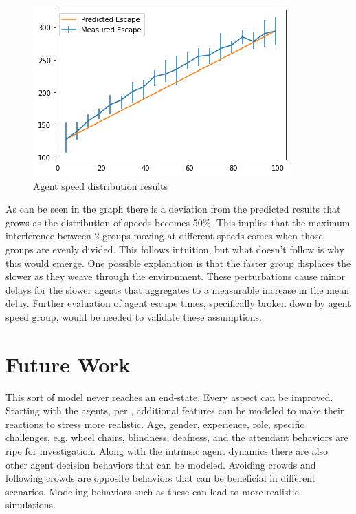 \documentclass[12pt,letterpaper]{article}
\begin{document}
\begin{figure} [!ht]
  \centering
  \includegraphics[width=.75\linewidth]{./figures/speed_dist_test.png}
  \caption{Agent speed distribution results}
  \label{fig:speedResults}
\end{figure}

As can be seen in the graph there is a deviation from the predicted results that grows as the distribution of speeds becomes 50\%.  This implies that the maximum interference between 2 groups moving at different speeds comes when those groups are evenly divided.  This follows intuition, but what doesn't follow is why this would emerge.  One possible explanation is that the faster group displaces the slower as they weave through the environment.  These perturbations cause minor delays for the slower agents that aggregates to a measurable increase in the mean delay.  Further evaluation of agent escape times, specifically broken down by agent speed group, would be needed to validate these assumptions.


  
\section{Future Work}
This sort of model never reaches an end-state. Every aspect can be improved.  Starting with the agents, per \cite{almeidaCrowdSimulationModeling2013}, additional features can be modeled to make their reactions to stress more realistic. Age, gender, experience, role, specific challenges, e.g. wheel chairs, blindness, deafness, and the attendant behaviors are ripe for investigation.  Along with the intrinsic agent dynamics there are also other agent decision behaviors that can be modeled.  Avoiding crowds and following crowds are opposite behaviors that can be beneficial in different scenarios.  Modeling behaviors such as these can lead to more realistic simulations.
\end{document}
